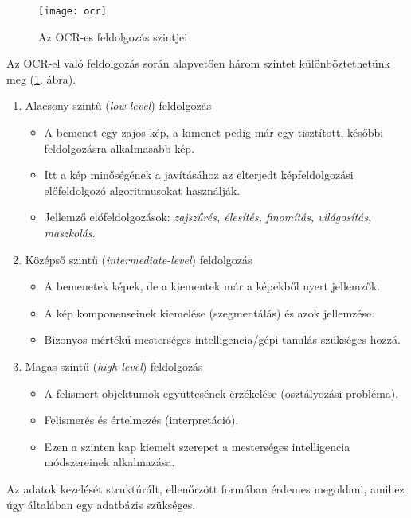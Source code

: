 \begin{figure}[h]
\texttt{[image: ocr]}
\centering
\caption{Az OCR-es feldolgozás szintjei}
\label{fig:feldolgozasi_szintek}
\end{figure}

Az OCR-el való feldolgozás során alapvetően három szintet \cite{feldolgozasi_szintek} különböztethetünk meg (\ref{fig:feldolgozasi_szintek}. ábra). 

\begin{enumerate}
\item Alacsony szintű (\textit{low-level}) feldolgozás
	\begin{itemize}
	\item A bemenet egy zajos kép, a kimenet pedig már egy tisztított, későbbi feldolgozásra alkalmasabb kép.
	\item Itt a kép minőségének a javításához az elterjedt képfeldolgozási előfeldolgozó algoritmusokat használják.
	\item Jellemző előfeldolgozások: \textit{zajszűrés, élesítés, finomítás, világosítás, maszkolás}.
	\end{itemize}
\item Középső szintű (\textit{intermediate-level}) feldolgozás
	\begin{itemize}
	\item A bemenetek képek, de a kiementek már a képekből nyert jellemzők.
	\item A kép komponenseinek kiemelése (szegmentálás) és azok jellemzése.
	\item Bizonyos mértékű mesterséges intelligencia/gépi tanulás szükséges hozzá.
	\end{itemize}
\item Magas szintű (\textit{high-level}) feldolgozás
	\begin{itemize}
	\item A felismert objektumok együttesének érzékelése (osztályozási probléma).
	\item Felismerés és értelmezés (interpretáció).
	\item Ezen a szinten kap kiemelt szerepet a mesterséges intelligencia módszereinek alkalmazása.
	\end{itemize}
\end{enumerate}

Az adatok kezelését struktúrált, ellenőrzött formában érdemes megoldani, amihez úgy általában egy adatbázis szükséges.


